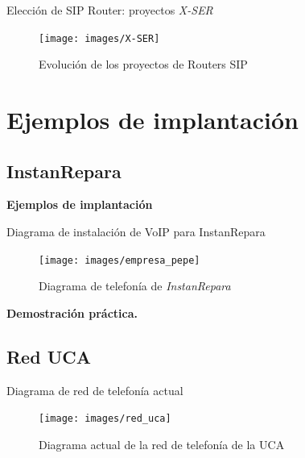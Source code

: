 \documentclass{beamer}
\begin{document}
\begin{frame}{Elección de SIP Router: proyectos \emph{X-SER}}
  
  \begin{figure}
    \centering
    \texttt{[image: images/X-SER]}
  \caption{Evolución de los proyectos de Routers SIP}
  \end{figure}
\end{frame}

\section{Ejemplos de implantación}
\label{sec:ejemplo-de-impl}

\subsection{InstanRepara}
\label{sec:instanrepara}
\begin{frame}
  \begin{center}
    \huge{\textbf{Ejemplos de implantación}}
  \end{center}
\end{frame}


\begin{frame}{Diagrama de instalación de VoIP para InstanRepara}
\begin{figure}
  \centering
  \texttt{[image: images/empresa\_pepe]}
  \caption{Diagrama de telefonía de \emph{InstanRepara}}
  \label{fig:Diagrama-instanrepara}
\end{figure}
\end{frame}

\begin{frame}
  \begin{center}
    \huge{\textbf{Demostración práctica.}}
  \end{center}
\end{frame}

\subsection{Red UCA}

\begin{frame}{Diagrama de red de telefonía actual}
  \begin{figure}
    \centering
    \texttt{[image: images/red\_uca]}
    \caption{Diagrama actual de la red de telefonía de la UCA}
    \label{fig:uca-inicial}
  \end{figure}
\end{frame}
\end{document}
